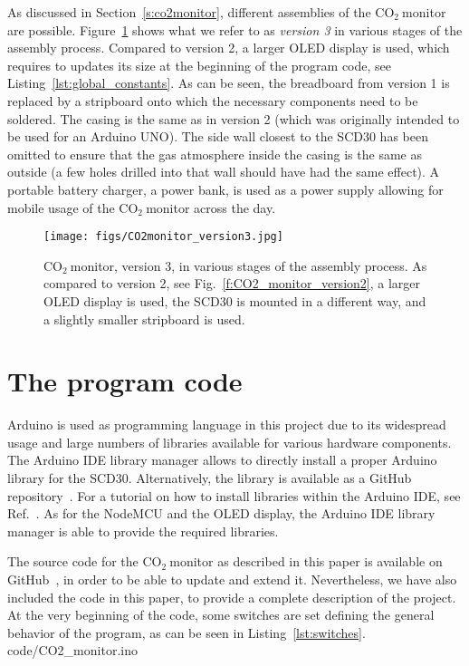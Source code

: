 \documentclass[12pt,a4paper]{article}
\newcommand{\coo}{\ensuremath{\mathrm{CO_2}~}}
\begin{document}
As discussed in Section~\ref{s:co2monitor}, different assemblies of the \coo monitor are possible. Figure~\ref{f:CO2_monitor_version3} shows what we refer to as \textit{version 3} in various stages of the assembly process. Compared to version 2, a larger OLED display is used, which requires to updates its size at the beginning of the program code, see Listing~\ref{lst:global_constants}. As can be seen, the breadboard from version 1 is replaced by a stripboard onto which the necessary components need to be soldered. The casing is the same as in version 2 (which was originally intended to be used for an Arduino UNO). The side wall closest to the SCD30 has been omitted to ensure that the gas atmosphere inside the casing is the same as outside (a few holes drilled into that wall should have had the same effect). A portable battery charger, a power bank, is used as a power supply allowing for mobile usage of the \coo monitor across the day. 
\begin{figure}[t]
\centering
\texttt{[image: figs/CO2monitor\_version3.jpg]}
\caption{\coo monitor, version 3, in various stages of the assembly process. As compared to version 2, see Fig.~\ref{f:CO2_monitor_version2}, a larger OLED display is used, the SCD30 is mounted in a different way, and a slightly smaller stripboard is used.}
\label{f:CO2_monitor_version3}
\end{figure}


\section{The program code}\label{s:code}
Arduino is used as programming language in this project due to its widespread usage and large numbers of libraries available for various hardware components. The Arduino IDE library manager allows to directly install a proper Arduino library for the SCD30. Alternatively, the library is available as a GitHub repository~\cite{SPARKFUN2020}. For a tutorial on how to install libraries within the Arduino IDE, see Ref.~\cite{SPARKFUN2020A}.
As for the NodeMCU and the OLED display, the Arduino IDE library manager is able to provide the required libraries.

The source code for the \coo monitor as described in this paper is available on GitHub~\cite{KOEHN2020}, in order to be able to update and extend it. Nevertheless, we have also included the code in this paper, to provide a complete description of the project. At the very beginning of the code, some switches are set defining the general behavior of the program, as can be seen in Listing~\ref{lst:switches}.
%
{code/CO2_monitor.ino} 
\end{document}
